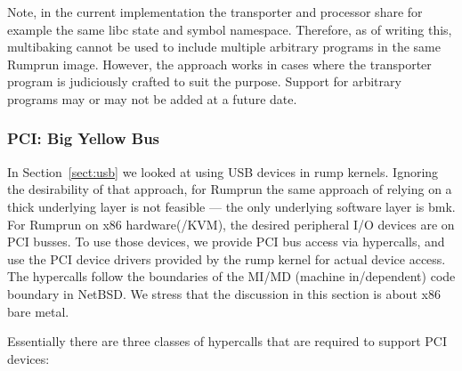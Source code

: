 Note, in the current implementation the transporter and processor
share for example the same libc state and symbol namespace.  Therefore,
as of writing this, multibaking cannot be used to include multiple arbitrary
programs in the same Rumprun image.  However, the approach works in cases
where the transporter program is judiciously crafted to suit the purpose.
Support for arbitrary programs may or may not be added at a future date.


\subsubsection{PCI: Big Yellow Bus}
\label{sect:pci}

In Section~\ref{sect:usb} we looked at using USB devices in rump kernels.
Ignoring the desirability of that approach, for Rumprun the same approach
of relying on a thick underlying layer is not feasible --- the only
underlying software layer is bmk.  For Rumprun on x86 hardware(/KVM), the
desired peripheral I/O devices are on PCI busses.  To use those devices,
we provide PCI bus access via hypercalls, and use the PCI device drivers
provided by the rump kernel for actual device access.  The hypercalls
follow the boundaries of the MI/MD (machine in/dependent) code boundary
in NetBSD.  We stress that the discussion in this section is about x86
bare metal.

Essentially there are three classes of hypercalls that are required to
support PCI devices:

